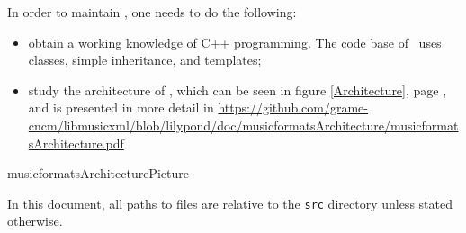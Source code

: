 In order to maintain \lib, one needs to do the following:
\begin{itemize}
\item obtain a working knowledge of C++ programming. The code base of \lib\ uses classes, simple inheritance, and templates;


\item study the architecture of \lib, which can be seen in figure \ref {Architecture}, page \pageref {Architecture}, and is presented in more detail in \url{https://github.com/grame-cncm/libmusicxml/blob/lilypond/doc/musicformatsArchitecture/musicformatsArchitecture.pdf}
\end{itemize}

{musicformatsArchitecturePicture}

In this document, all paths to files are relative to the {\tt src} directory unless stated otherwise.
